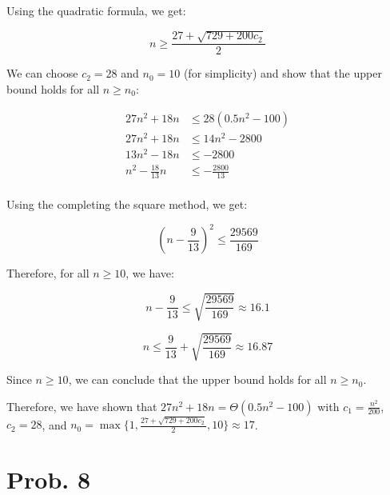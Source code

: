 \documentclass[12pt]{article}
\begin{document}
Using the quadratic formula, we get:

$$n \geq \frac{27 + \sqrt{729 + 200c_2}}{2}$$

We can choose $c_2 = 28$ and $n_0 = 10$ (for simplicity) and show that the upper bound holds for all $n \geq n_0$:

\begin{align*}
27n^2 + 18n &\leq 28(0.5n^2 - 100) \\
27n^2 + 18n &\leq 14n^2 - 2800 \\
13n^2 - 18n &\leq -2800 \\
n^2 - \frac{18}{13}n &\leq -\frac{2800}{13} \\
\end{align*}

Using the completing the square method, we get:

$$\left(n - \frac{9}{13}\right)^2 \leq \frac{29569}{169}$$

Therefore, for all $n \geq 10$, we have:

$$n - \frac{9}{13} \leq \sqrt{\frac{29569}{169}} \approx 16.1$$

$$n \leq \frac{9}{13} + \sqrt{\frac{29569}{169}} \approx 16.87$$

Since $n \geq 10$, we can conclude that the upper bound holds for all $n \geq n_0$.

Therefore, we have shown that $27n^2 + 18n = \Theta(0.5n^2 - 100)$ with $c_1 = \frac{n^2}{200}$, $c_2 = 28$, and $n_0 = \max\{1, \frac{27 + \sqrt{729 + 200c_2}}{2}, 10\} \approx 17$.

\section{Prob. 8}
\end{document}
